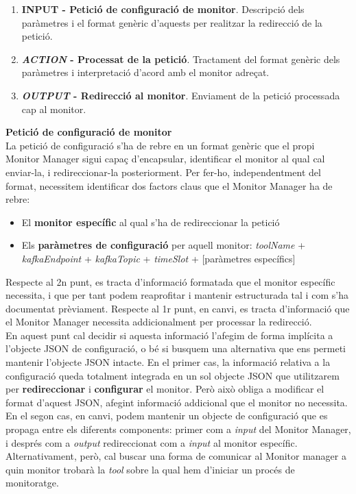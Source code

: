 \begin{enumerate}
\item \textbf{INPUT - Petició de configuració de monitor}. Descripció dels paràmetres i el format genèric d'aquests per realitzar la redirecció de la petició.
\item \textbf{\textit{ACTION} - Processat de la petició}. Tractament del format genèric dels paràmetres i interpretació d'acord amb el monitor adreçat.
\item \textbf{\textit{OUTPUT} - Redirecció al monitor}. Enviament de la petició processada cap al monitor.
\end{enumerate}

\noindent \textbf{\large Petició de configuració de monitor}\\

\noindent La petició de configuració s'ha de rebre en un format genèric que el propi Monitor Manager sigui capaç d'encapsular, identificar el monitor al qual cal enviar-la, i redireccionar-la posteriorment. Per fer-ho, independentment del format, necessitem identificar dos factors claus que el Monitor Manager ha de rebre:

\begin{itemize}
\item El \textbf{monitor específic} al qual s'ha de redireccionar la petició
\item Els \textbf{paràmetres de configuració} per aquell monitor: \textit{toolName} + \textit{kafkaEndpoint} + \textit{kafkaTopic} + \textit{timeSlot} + [paràmetres específics]
\end{itemize} 

Respecte al 2n punt, es tracta d'informació formatada que el monitor específic necessita, i que per tant podem reaprofitar i mantenir estructurada tal i com s'ha documentat prèviament. Respecte al 1r punt, en canvi, es tracta d'informació que el Monitor Manager necessita addicionalment per processar la redirecció.\\

En aquest punt cal decidir si aquesta informació l'afegim de forma implícita a l'objecte JSON de configuració, o bé si busquem una alternativa que ens permeti mantenir l'objecte JSON intacte. En el primer cas, la informació relativa a la configuració queda totalment integrada en un sol objecte JSON que utilitzarem per \textbf{redireccionar} i \textbf{configurar} el monitor. Però això obliga a modificar el format d'aquest JSON, afegint informació addicional que el monitor no necessita. En el segon cas, en canvi, podem mantenir un objecte de configuració que es propaga entre els diferents components: primer com a \textit{input} del Monitor Manager, i després com a \textit{output} redireccionat com a \textit{input} al monitor específic. Alternativament, però, cal buscar una forma de comunicar al Monitor manager a quin monitor trobarà la \textit{tool} sobre la qual hem d'iniciar un procés de monitoratge.\\

